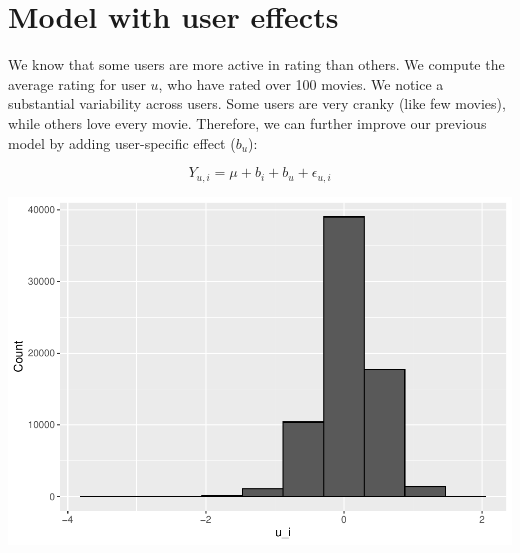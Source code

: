 \documentclass[]{article}
\newenvironment{Shaded}{\begin{snugshade}}{\end{snugshade}}
\newcommand{\CommentTok}[1]{\textcolor[rgb]{0.56,0.35,0.01}{\textit{#1}}}
\newcommand{\DataTypeTok}[1]{\textcolor[rgb]{0.13,0.29,0.53}{#1}}
\newcommand{\DecValTok}[1]{\textcolor[rgb]{0.00,0.00,0.81}{#1}}
\newcommand{\KeywordTok}[1]{\textcolor[rgb]{0.13,0.29,0.53}{\textbf{#1}}}
\newcommand{\NormalTok}[1]{#1}
\newcommand{\OperatorTok}[1]{\textcolor[rgb]{0.81,0.36,0.00}{\textbf{#1}}}
\newcommand{\StringTok}[1]{\textcolor[rgb]{0.31,0.60,0.02}{#1}}
\begin{document}
\section{Model with user effects}
\label{sec:uer}

We know that some users are more active in rating than others. We
compute the average rating for user \(u\), who have rated over 100
movies. We notice a substantial variability across users. Some users are
very cranky (like few movies), while others love every movie. Therefore,
we can further improve our previous model by adding user-specific effect
(\(b_{u}\)):

\begin{equation}
Y_{u, i} = \mu + b_{i} + b_{u} + \epsilon_{u, i}
\end{equation}

\begin{Shaded}
\end{Shaded}

\includegraphics{Project_MovieLens_files/figure-latex/unnamed-chunk-26-1.pdf}
\end{document}
